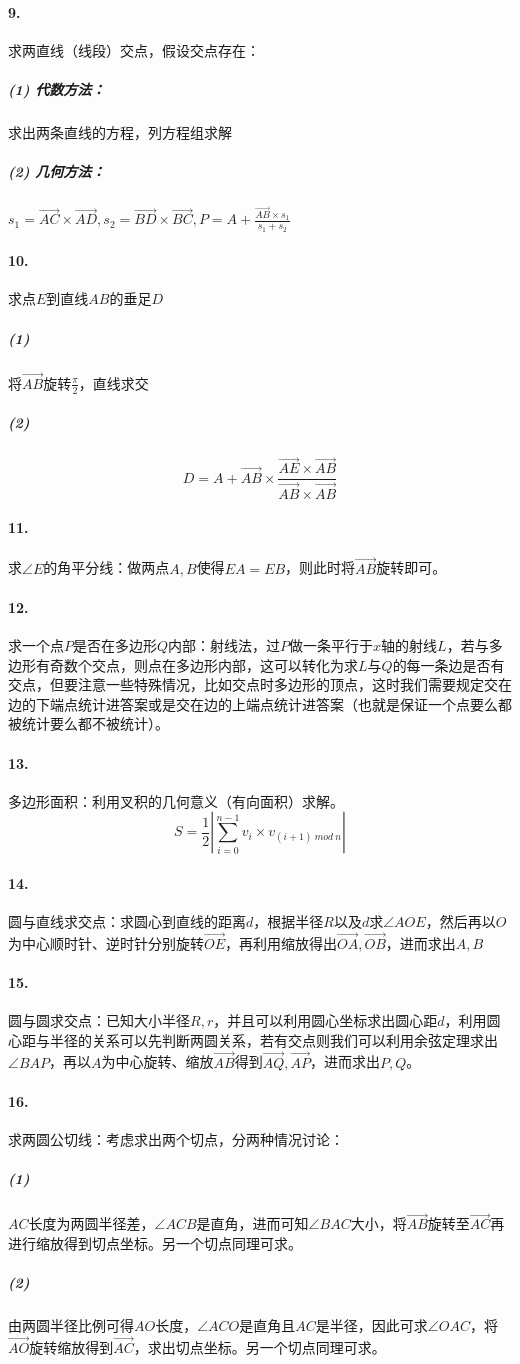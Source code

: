 \documentclass[]{cpp}
\renewcommand{\Vec}{\overrightarrow}
\begin{document}
\paragraph{9.} 求两直线（线段）交点，假设交点存在：
\subparagraph{(1) 代数方法：} 求出两条直线的方程，列方程组求解
\subparagraph{(2) 几何方法：} $s_1=\Vec{AC}\times\Vec{AD},s_2=\Vec{BD}\times\Vec{BC},P=A+\frac{\Vec{AB}\times s_1}{s_1 + s_2}$
\paragraph{10.} 求点$E$到直线$AB$的垂足$D$
\subparagraph{(1)} 将$\Vec{AB}$旋转$\frac{\pi}{2}$，直线求交
\subparagraph{(2)} $$D=A+\Vec{AB}\times\frac{\Vec{AE}\times\Vec{AB}}{\Vec{AB}\times\Vec{AB}}$$
\paragraph{11.} 求$\angle{E}$的角平分线：做两点$A,B$使得$EA=EB$，则此时将$\Vec{AB}$旋转即可。
\paragraph{12.} 求一个点$P$是否在多边形$Q$内部：射线法，过$P$做一条平行于$x$轴的射线$L$，若与多边形有奇数个交点，则点在多边形内部，这可以转化为求$L$与$Q$的每一条边是否有交点，但要注意一些特殊情况，比如交点时多边形的顶点，这时我们需要规定交在边的下端点统计进答案或是交在边的上端点统计进答案（也就是保证一个点要么都被统计要么都不被统计）。
\paragraph{13.} 多边形面积：利用叉积的几何意义（有向面积）求解。$$S=\frac{1}{2}\left|\sum\limits_{i=0}^{n-1} v_i \times v_{(i+1)\ mod\ n}\right|$$
\paragraph{14.} 圆与直线求交点：求圆心到直线的距离$d$，根据半径$R$以及$d$求$\angle{AOE}$，然后再以$O$为中心顺时针、逆时针分别旋转$\Vec{OE}$，再利用缩放得出$\Vec{OA},\Vec{OB}$，进而求出$A,B$
\paragraph{15.} 圆与圆求交点：已知大小半径$R,r$，并且可以利用圆心坐标求出圆心距$d$，利用圆心距与半径的关系可以先判断两圆关系，若有交点则我们可以利用余弦定理求出$\angle{BAP}$，再以$A$为中心旋转、缩放$\Vec{AB}$得到$\Vec{AQ},\Vec{AP}$，进而求出$P,Q$。
\paragraph{16.} 求两圆公切线：考虑求出两个切点，分两种情况讨论：
\subparagraph{(1)} $AC$长度为两圆半径差，$\angle{ACB}$是直角，进而可知$\angle{BAC}$大小，将$\Vec{AB}$旋转至$\Vec{AC}$再进行缩放得到切点坐标。另一个切点同理可求。
\subparagraph{(2)} 由两圆半径比例可得$AO$长度，$\angle{ACO}$是直角且$AC$是半径，因此可求$\angle{OAC}$，将$\Vec{AO}$旋转缩放得到$\Vec{AC}$，求出切点坐标。另一个切点同理可求。
\end{document}

